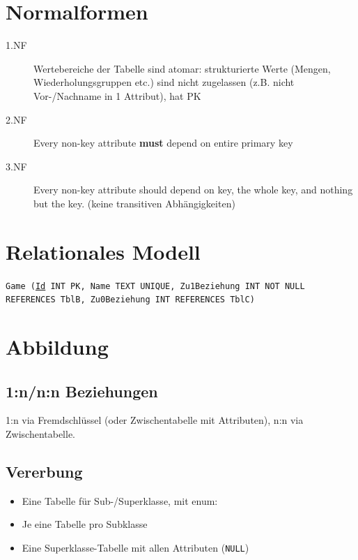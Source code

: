 
\newcommand{\TITLE}{Datenbanksysteme 1}
\newcommand{\AUTHOR}{Florian Bruhin, Mona Panchaud}
\newcommand{\INSTITUTE}{Ostschweizer Fachhochschule}


\footnotesize
\begin{multicols*}{3}

\setlength{\premulticols}{1pt}
\setlength{\postmulticols}{1pt}
\setlength{\multicolsep}{1pt}
\setlength{\columnsep}{2pt}

\section{Normalformen}
\begin{description}
    \item[1.NF] Wertebereiche der Tabelle sind atomar: strukturierte Werte (Mengen, Wiederholungsgruppen etc.) sind nicht zugelassen (z.B. nicht Vor-/Nachname in 1 Attribut), hat PK
    \item[2.NF] Every non-key attribute \textbf{must} depend on entire primary key
    \item[3.NF] Every non-key attribute should depend on key, the whole key, and nothing but the key. (keine transitiven Abhängigkeiten)
\end{description}

\section{Relationales Modell}

\texttt{Game (\underline{Id} INT PK, Name TEXT UNIQUE, Zu1Beziehung INT NOT NULL REFERENCES TblB, Zu0Beziehung INT REFERENCES TblC)}

\section{Abbildung}
\subsection{1:n/n:n Beziehungen}
1:n via Fremdschlüssel (oder Zwischentabelle mit Attributen), n:n via
Zwischentabelle.
\subsection{Vererbung}
\begin{itemize}
\item{Eine Tabelle für Sub-/Superklasse, mit enum: \\ }
\item{Je eine Tabelle pro Subklasse}
\item{Eine Superklasse-Tabelle mit allen Attributen (\verb!NULL!)}
\end{itemize}


\end{multicols*}
